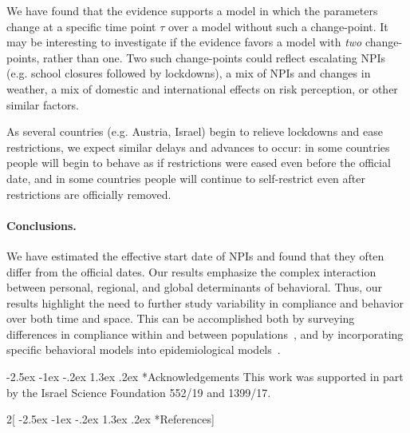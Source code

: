 \documentclass[12pt]{extarticle}
\makeatletter
\renewcommand\section{\@startsection {section}{1}{\z@}%
     {-2.5ex \@plus -1ex \@minus -.2ex}%
     {1.3ex \@plus.2ex}%
    {\Large\bfseries}}
\makeatother
\begin{document}
We have found that the evidence supports a model in which the parameters change at a specific time point $\tau$ over a model without such a change-point. It may be interesting to investigate if the evidence favors a model with \emph{two} change-points, rather than one. 
Two such change-points could reflect escalating NPIs (e.g. school closures followed by lockdowns), a mix of NPIs and changes in weather, a mix of domestic and international effects on risk perception, or other similar factors.

As several countries (e.g. Austria, Israel) begin to relieve lockdowns and ease restrictions, we expect similar delays and advances to occur: in some countries people will begin to behave as if restrictions were eased even before the official date, and in some countries people will continue to self-restrict even after restrictions are officially removed.

\paragraph*{Conclusions.}
We have estimated the effective start date of NPIs and found that they often differ from the official dates.
Our results emphasize the complex interaction between personal, regional, and global determinants of behavioral. Thus, our results highlight the need to further study variability in compliance and behavior over both time and space. This can be accomplished both by surveying differences in compliance within and between populations~\citep{Atchison2020}, and by incorporating specific behavioral models into epidemiological models~\citep{Fenichela2011,Arthur2020}.

{\small
\section*{Acknowledgements}
This work was supported in part by the Israel Science Foundation 552/19 and 1399/17.
}


\pagebreak
\begin{multicols}{2}[\section*{References}]
\nolinenumbers

%

\end{multicols}

\pagebreak
\end{document}
